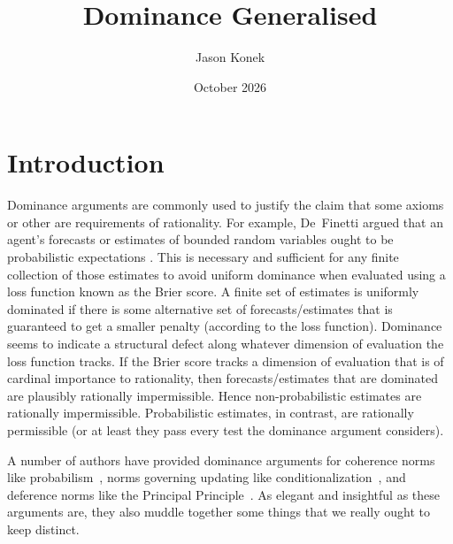 \documentclass[11pt]{article}
\title{Dominance Generalised}
\author{Jason Konek}
\date{October 2026}
\theoremstyle{definition}
\begin{document}
\maketitle

\begin{abstract}
\end{abstract}


\section{Introduction}


Dominance arguments are commonly used to justify the claim that some axioms or other are requirements of rationality. For example, De~Finetti argued that an agent's forecasts or estimates of bounded random variables ought to be probabilistic expectations \cite[\S1.6, \S3.3]{deFinetti1974}. This is necessary and sufficient for any finite collection of those estimates to avoid uniform dominance when evaluated using a loss function known as the Brier score. A finite set of estimates is uniformly dominated if there is some alternative set of forecasts/estimates that is guaranteed to get a smaller penalty (according to the loss function). Dominance seems to indicate a structural defect along whatever dimension of evaluation the loss function tracks. If the Brier score tracks a dimension of evaluation that is of cardinal importance to rationality, then forecasts/estimates that are dominated are plausibly rationally impermissible. Hence non-probabilistic estimates are rationally impermissible. Probabilistic estimates, in contrast, are rationally permissible (or at least they pass every test the dominance argument considers).


A number of authors have provided dominance arguments for coherence norms like probabilism~\cite{Joyce2009,Predd2009,SSK2009,Pettigrew2022,Nielsen2023}, norms governing updating like conditionalization~\cite{Briggs2020,Nielsen2021}, and deference norms like the Principal Principle~\cite[Chapter~10]{Pettigrew2016}. As elegant and insightful as these arguments are, they also muddle together some things that we really ought to keep distinct.







\newpage
\end{document}
